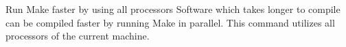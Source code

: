 \begin{block}{Run Make faster by using all processors}
  Software which takes longer to compile can be compiled faster by running Make in parallel. This command utilizes all processors of the current machine.
  \vspace{1em}
\end{block}
